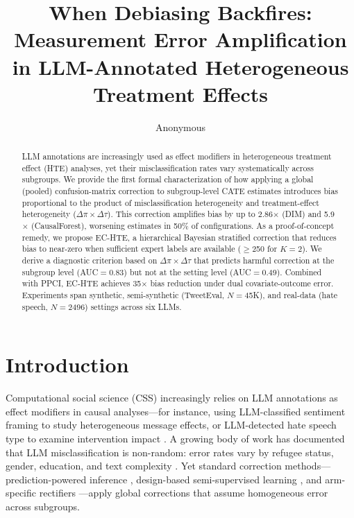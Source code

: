 \documentclass[11pt,twocolumn]{article}
\title{When Debiasing Backfires: Measurement Error Amplification\\in LLM-Annotated Heterogeneous Treatment Effects}
\author{Anonymous}
\date{}
\begin{document}
\maketitle

\begin{abstract}
LLM annotations are increasingly used as effect modifiers in heterogeneous treatment effect (HTE) analyses, yet their misclassification rates vary systematically across subgroups. We provide the first formal characterization of how applying a global (pooled) confusion-matrix correction to subgroup-level CATE estimates introduces bias proportional to the product of misclassification heterogeneity and treatment-effect heterogeneity ($\Delta\pi \times \Delta\tau$). This correction amplifies bias by up to 2.86$\times$ (DIM) and 5.9$\times$ (CausalForest), worsening estimates in 50\% of configurations. As a proof-of-concept remedy, we propose EC-HTE, a hierarchical Bayesian stratified correction that reduces bias to near-zero when sufficient expert labels are available ($\geq$250 for $K{=}2$). We derive a diagnostic criterion based on $\Delta\pi \times \Delta\tau$ that predicts harmful correction at the subgroup level (AUC$=$0.83) but not at the setting level (AUC$=$0.49). Combined with PPCI, EC-HTE achieves 35$\times$ bias reduction under dual covariate-outcome error. Experiments span synthetic, semi-synthetic (TweetEval, $N{=}$45K), and real-data (hate speech, $N{=}$2496) settings across six LLMs.
\end{abstract}

\section{Introduction}

Computational social science (CSS) increasingly relies on LLM annotations as effect modifiers in causal analyses---for instance, using LLM-classified sentiment framing to study heterogeneous message effects, or LLM-detected hate speech type to examine intervention impact \citep{tornberg2024chatgpt, gilardi2023chatgpt, ziems2024can}. A growing body of work has documented that LLM misclassification is non-random: error rates vary by refugee status, gender, education, and text complexity \citep{ashwin2025using}. Yet standard correction methods---prediction-powered inference \citep[PPI;][]{angelopoulos2023prediction}, design-based semi-supervised learning \citep[DSL;][]{egami2024using}, and arm-specific rectifiers \citep{mozer2026adjusting}---apply global corrections that assume homogeneous error across subgroups.
\end{document}
